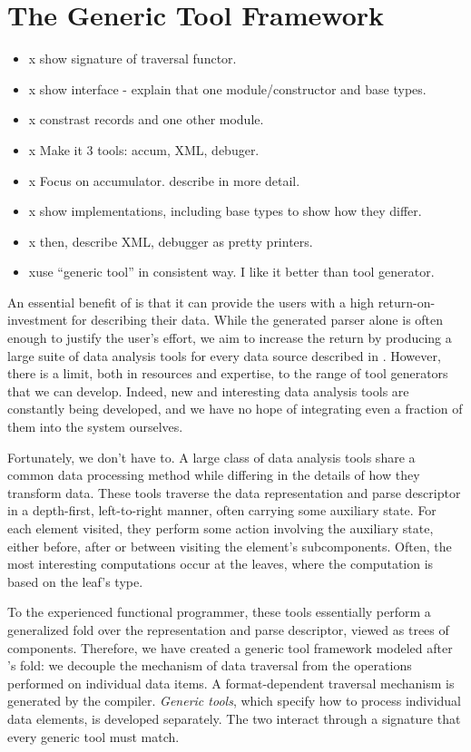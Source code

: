 \section{The Generic Tool Framework}
\label{sec:gen-tool}

\begin{itemize}
\item x show signature of traversal functor.
\item x show interface - explain that one module/constructor and base types.
\item x constrast records and one other module.
\item x Make it 3 tools: accum, XML, debuger.
\item x Focus on accumulator. describe in more detail.
\item x show implementations,  including base types to show how they differ.
\item x then, describe XML, debugger as pretty printers.
\item xuse ``generic tool'' in consistent way. I like it better than
  tool generator.
\end{itemize}

An essential benefit of \padsml{} is that it can provide the users
with a high return-on-investment for describing their data. While the
generated parser alone is often enough to justify the user's effort,
we aim to increase the return by producing a large suite of data
analysis tools for every data source described in \padsml{}. However,
there is a limit, both in resources and expertise, to the range of
tool generators that we can develop. Indeed, new and interesting data
analysis tools are constantly being developed, and we have no hope of
integrating even a fraction of them into the \padsml{} system
ourselves.

Fortunately, we don't have to. A large class of data analysis tools
share a common data processing method while differing in the details
of how they transform data. These tools traverse the data
representation and parse descriptor in a depth-first, left-to-right
manner, often carrying some auxiliary state.  For each element
visited, they perform some action involving the auxiliary state,
either before, after or between visiting the element's subcomponents.
Often, the most interesting computations occur at the leaves, where
the computation is based on the leaf's type.  

To the experienced functional programmer, these tools essentially
perform a generalized fold over the representation and parse
descriptor, viewed as trees of components. Therefore, we have created
a generic tool framework modeled after \ml{}'s fold: we decouple the
mechanism of data traversal from the operations performed on
individual data items. A format-dependent traversal mechanism is
generated by the \padsml{} compiler. \emph{Generic tools}, which
specify how to process individual data elements, is developed
separately. The two interact through a signature that every generic
tool must match.

